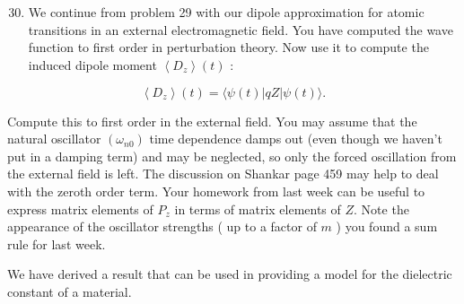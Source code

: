 \documentclass[12pt]{article}
\begin{document}
\section{}
\begin{enumerate}
  \setcounter{enumi}{29}
  \item We continue from problem 29 with our dipole approximation for atomic transitions in an external electromagnetic field. You have computed the wave function to first order in perturbation theory. Now use it to compute the induced dipole moment $\left\langle D_{z}\right\rangle(t)$ :
\end{enumerate}


\begin{equation*}
\left\langle D_{z}\right\rangle(t)=\langle\psi(t)|q Z| \psi(t)\rangle . \tag{2}
\end{equation*}


Compute this to first order in the external field. You may assume that the natural oscillator $\left(\omega_{n 0}\right)$ time dependence damps out (even though we haven't put in a damping term) and may be neglected, so only the forced oscillation from the external field is left. The discussion on Shankar page 459 may help to deal with the zeroth order term. Your homework from last week can be useful to express matrix elements of $P_{z}$ in terms of matrix elements of $Z$. Note the appearance of the oscillator strengths ( up to a factor of $m$ ) you found a sum rule for last week.

We have derived a result that can be used in providing a model for the dielectric constant of a material.
\end{document}
